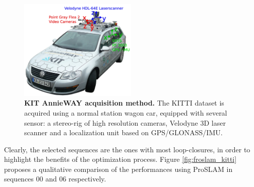 \begin{figure}[!htb]
    \centering
    \includegraphics[width=0.5\textwidth]{figures/use_cases/kitti_setup.png}
    \caption{\textbf{KIT AnnieWAY acquisition method.} The KITTI dataset is acquired using a normal station wagon car, equipped with several sensor: a stereo-rig of high resolution cameras, Velodyne 3D laser scanner and a localization unit based on GPS/GLONASS/IMU.}
    \label{fig:kit_annieway}
\end{figure}

Clearly, the selected sequences are the ones with most loop-closures, in order to highlight the benefits of the optimization process. Figure \ref{fig:froslam_kitti} proposes a qualitative comparison of the performances using ProSLAM in sequences 00 and 06 respectively. 

